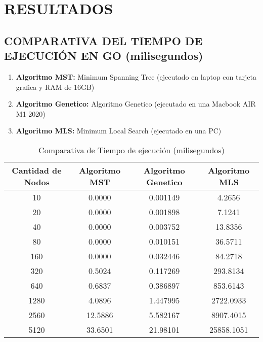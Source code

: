 \documentclass{article}
\begin{document}
\section{RESULTADOS}
\subsection{COMPARATIVA DEL TIEMPO DE EJECUCIÓN EN GO (milisegundos)}
\begin{enumerate}
    \item \textbf{Algoritmo MST:} Minimum Spanning Tree (ejecutado en laptop con tarjeta grafica y RAM de 16GB)
    \item \textbf{Algoritmo Genetico:} Algoritmo Genetico (ejecutado en una Macbook AIR M1 2020)
    \item \textbf{Algoritmo MLS:} Minimum Local Search (ejecutado en una PC)
\end{enumerate}


\begin{table}[H]
    \centering
    \begin{tabular}{||c c c c||} 
      \hline
      \textbf{Cantidad de Nodos} & \textbf{Algoritmo MST} & \textbf{Algoritmo Genetico} & \textbf{Algoritmo MLS} \\ [0.5ex] 
      \hline\hline
      10    &  0.0000   &  0.001149  &  4.2656      \\ [0.5ex]
      20    &  0.0000   &  0.001898  &  7.1241      \\ [0.5ex]
      40    &  0.0000   &  0.003752  &  13.8356     \\ [0.5ex]
      80    &  0.0000   &  0.010151  &  36.5711     \\ [0.5ex]
      160   &  0.0000   &  0.032446  &  84.2718     \\ [0.5ex]
      320   &  0.5024   &  0.117269  &  293.8134    \\ [0.5ex]
      640   &  0.6837   &  0.386897  &  853.6143    \\ [0.5ex]
      1280  &  4.0896   &  1.447995  &  2722.0933   \\ [0.5ex]
      2560  &  12.5886  &  5.582167  &  8907.4015   \\ [0.5ex]
      5120  &  33.6501  &  21.98101  &  25858.1051  \\ [0.5ex]
      \hline
    \end{tabular}
    \caption{Comparativa de Tiempo de ejecución (milisegundos)}
    \label{table:tiempoEjecucion}
\end{table} 
\end{document}
